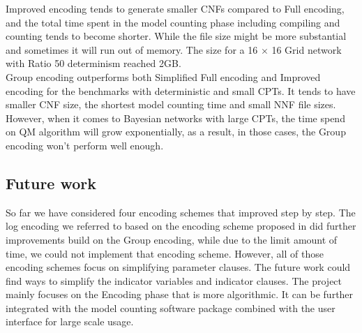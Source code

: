 \noindent Improved encoding tends to generate smaller CNFs compared to Full encoding, and the total time spent in the model counting phase including compiling and counting tends to become shorter. While the file size might be more substantial and sometimes it will run out of memory. The size for a 16 $\times$ 16 Grid network with Ratio 50 determinism reached 2GB.\\

\noindent Group encoding outperforms both Simplified Full encoding and Improved encoding for the benchmarks with deterministic and small CPTs. It tends to have smaller CNF size, the shortest model counting time and small NNF file sizes. However, when it comes to Bayesian networks with large CPTs, the time spend on QM algorithm will grow exponentially, as a result, in those cases, the Group encoding won't perform well enough.

\subsection{Future work}
So far we have considered four encoding schemes that improved step by step. The log encoding we referred to based on the encoding scheme proposed in \cite{2016-logencoding} did further improvements build on the Group encoding, while due to the limit amount of time, we could not implement that encoding scheme. However, all of those encoding schemes focus on simplifying parameter clauses. The future work could find ways to simplify the indicator variables and indicator clauses. The project mainly focuses on the Encoding phase that is more algorithmic. It can be further integrated with the model counting software package combined with the user interface for large scale usage.
